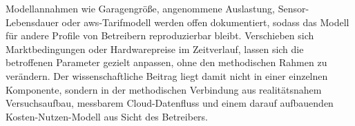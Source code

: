 Modellannahmen wie Garagengröße, angenommene Auslastung, Sensor-Lebensdauer oder \ac{aws}-Tarifmodell werden offen dokumentiert, sodass das Modell für andere Profile von Betreibern reproduzierbar bleibt. Verschieben sich Marktbedingungen oder Hardwarepreise im Zeitverlauf, lassen sich die betroffenen Parameter gezielt anpassen, ohne den methodischen Rahmen zu verändern. Der wissenschaftliche Beitrag liegt damit nicht in einer einzelnen Komponente, sondern in der methodischen Verbindung aus realitätsnahem Versuchsaufbau, messbarem Cloud-Datenfluss und einem darauf aufbauenden Kosten-Nutzen-Modell aus Sicht des Betreibers.
